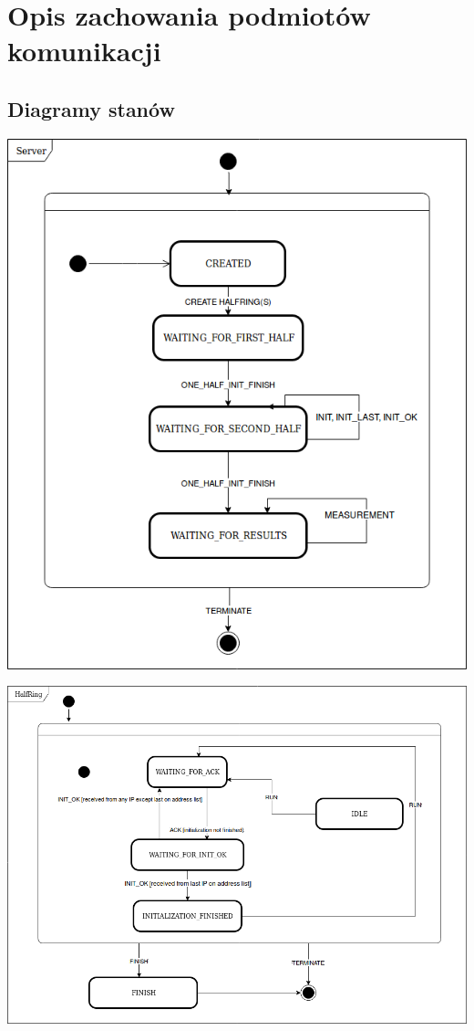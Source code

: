 \documentclass[a4paper,11pt]{article}
\begin{document}
\section{Opis zachowania podmiotów komunikacji}

\subsection{Diagramy stanów}
\begin{center}
	\centerline{\includegraphics[width=1.0\textwidth]{server_states}}
\end{center}
\begin{center}
	\centerline{\includegraphics[width=1.2\textwidth]{halfring_states}}
\end{center}
\end{document}
